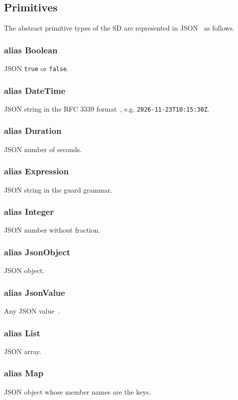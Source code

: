\documentclass[a4paper]{arrowhead}
\newcommand{\pdef}[1]{{\textcolor{ArrowheadGrey}{#1\label{sec:model:primitives:#1}\label{sec:model:primitives:#1s}}}}
\begin{document}
\subsection{Primitives}
\label{sec:model:primitives}
The abstract primitive types of the SD are represented in JSON~\cite{rfc8259} as follows.
\subsubsection*{alias \pdef{Boolean}}
JSON \texttt{true} or \texttt{false}.

\subsubsection*{alias \pdef{DateTime}}
JSON string in the RFC 3339 format~\cite{rfc3339}, e.g. \texttt{2026-\allowbreak{}11-\allowbreak{}23T10:15:30Z}.

\subsubsection*{alias \pdef{Duration}}
JSON number of seconds.

\subsubsection*{alias \pdef{Expression}}
JSON string in the guard grammar.

\subsubsection*{alias \pdef{Integer}}
JSON number without fraction.

\subsubsection*{alias \pdef{JsonObject}}
JSON object.

\subsubsection*{alias \pdef{JsonValue}}
Any JSON value~\cite{rfc8259}.

\subsubsection*{alias \pdef{List}}
JSON array.

\subsubsection*{alias \pdef{Map}}
JSON object whose member names are the keys.
\end{document}
